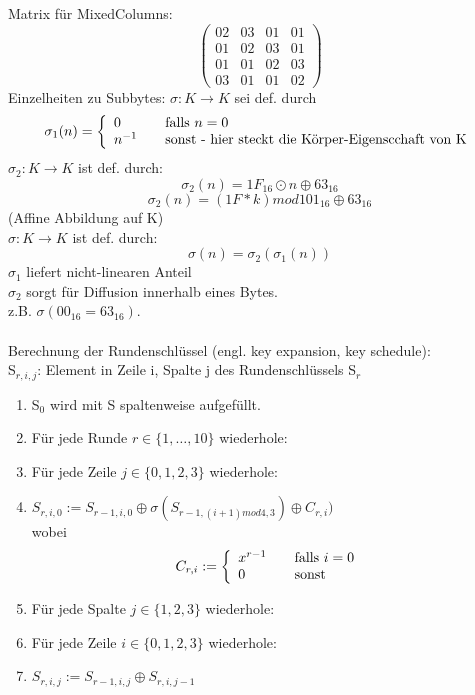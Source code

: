 \documentclass[a4paper,12pt]{article}
\begin{document}
Matrix für MixedColumns:
$$
	  \begin{pmatrix}
	    02 & 03 & 01 & 01 \\
	    01 & 02 & 03 & 01 \\
	    01 & 01 & 02 & 03 \\
	    03 & 01 & 01 & 02
	  \end{pmatrix}
$$
Einzelheiten zu Subbytes:
$\sigma: K\rightarrow K$ sei def. durch 
$$  \sigma_1(n) = \left\{ 
  \begin{array}{l l}
    0 & \quad \text{falls $n=0$ }\\
    n^{-1} & \quad \text{sonst - hier steckt die Körper-Eigenscchaft von K}\\
  \end{array} \right.
$$
$\sigma_2:K\rightarrow K $ ist def. durch:
$$\sigma_2(n)=1F_{16}\odot n\oplus63_{16}  $$
$$\sigma_2(n)=(1F*k)mod101_{16}\oplus63_{16} $$
(Affine Abbildung auf K)\\
$\sigma:K\rightarrow K$ ist def. durch:
$$\sigma(n) = \sigma_2(\sigma_1(n))$$
$\sigma_1$ liefert nicht-linearen Anteil\\
$\sigma_2$ sorgt für Diffusion innerhalb eines Bytes.\\
z.B. $\sigma(00_{16} = 63_{16})$.\\
\\
Berechnung der Rundenschlüssel (engl. key expansion, key schedule):\\
S$_{r,i,j}$: Element in Zeile i, Spalte j des Rundenschlüssels S$_r$
\begin{enumerate}
 \item S$_0$ wird mit S spaltenweise aufgefüllt.
 \item Für jede Runde $r\in\{1,\dots,10\}$ wiederhole:
 \item Für jede Zeile $j\in\{0,1,2,3\}$ wiederhole:
 \item $S_{r,i,0}:=S_{r-1,i,0}\oplus\sigma(S_{r-1,(i+1)mod4,3})\oplus C_{r,i})$\\
	wobei
      $$C_{r,i}:= \left\{ 
	  \begin{array}{l l}
	  x^{r-1} & \quad \text{falls $i=0$ }\\
	  0 & \quad \text{sonst}\\
	\end{array} \right.
      $$
  \item Für jede Spalte $j\in\{1,2,3\}$ wiederhole:
  \item Für jede Zeile $i\in\{0,1,2,3\}$ wiederhole:
  \item $S_{r,i,j}:=S_{r-1,i,j}\oplus S_{r,i,j-1}$
\end{enumerate}
\end{document}
